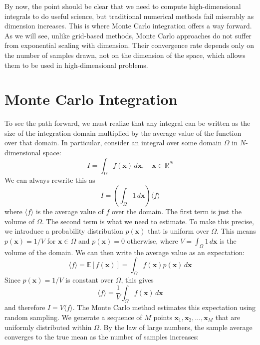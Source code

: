 By now, the point should be clear that we need to compute high-dimensional integrals to do useful science, but traditional numerical methods fail miserably as dimension increases. This is where Monte Carlo integration offers a way forward. As we will see, unlike grid-based methods, Monte Carlo approaches do not suffer from exponential scaling with dimension. Their convergence rate depends only on the number of samples drawn, not on the dimension of the space, which allows them to be used in high-dimensional problems.

\section{Monte Carlo Integration}

To see the path forward, we must realize that any integral can be written as the size of the integration domain multiplied by the average value of the function over that domain. In particular, consider an integral over some domain $\Omega$ in $N$-dimensional space:
\begin{equation}
    I = \int_{\Omega} f(\mathbf{x}) \, d\mathbf{x}, \quad \mathbf{x} \in \mathbb{R}^N
\end{equation}
We can always rewrite this as
\begin{equation}
    I = \left(\int_{\Omega} 1 \, d\mathbf{x}\right) \langle f \rangle
\end{equation}
where $\langle f \rangle$ is the average value of $f$ over the domain. The first term is just the volume of $\Omega$. The second term is what we need to estimate. To make this precise, we introduce a probability distribution $p(\mathbf{x})$ that is uniform over $\Omega$. This means $p(\mathbf{x}) = 1/V$ for $\mathbf{x} \in \Omega$ and $p(\mathbf{x}) = 0$ otherwise, where $V = \int_{\Omega} 1 \, d\mathbf{x}$ is the volume of the domain. We can then write the average value as an expectation:
\begin{equation}
    \langle f \rangle = \mathbb{E}[f(\mathbf{x})] = \int_{\Omega} f(\mathbf{x}) p(\mathbf{x}) \, d\mathbf{x}
\end{equation}
Since $p(\mathbf{x}) = 1/V$ is constant over $\Omega$, this gives
\begin{equation}
    \langle f \rangle = \frac{1}{V} \int_{\Omega} f(\mathbf{x}) \, d\mathbf{x}
\end{equation}
and therefore $I = V \langle f \rangle$. The Monte Carlo method estimates this expectation using random sampling. We generate a sequence of $M$ points $\mathbf{x}_1, \mathbf{x}_2, \ldots, \mathbf{x}_M$ that are uniformly distributed within $\Omega$. By the law of large numbers, the sample average converges to the true mean as the number of samples increases:

